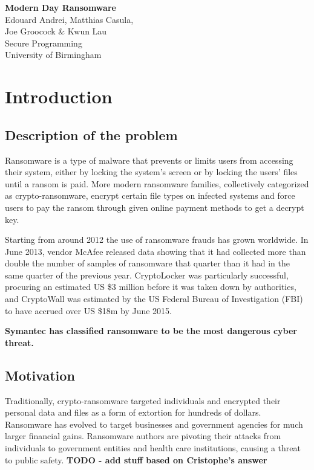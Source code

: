 \documentclass[10pt,a4paper]{article}
\begin{document}
\begin{titlepage}
  \vspace*{\fill}
  \begin{center}
    {\Huge \textbf{Modern Day Ransomware}}\\[0.5cm]
    {\Large Edouard Andrei, Matthias Casula,}\\
    {\Large Joe Groocock \& Kwun Lau}\\[0.6cm]
    {\large Secure Programming}\\
    {\large University of Birmingham}\\[0.4cm]
    {\large {}}
  \end{center}
  \vspace*{\fill}
\end{titlepage}

\tableofcontents

\newpage

\section{Introduction}
\subsection{Description of the problem}
Ransomware is a type of malware that prevents or limits users from accessing their system, either by locking the system's screen or by locking the users' files until a ransom is paid. More modern ransomware families, collectively categorized as crypto-ransomware, encrypt certain file types on infected systems and force users to pay the ransom through given online payment methods to get a decrypt key.

Starting from around 2012 the use of ransomware frauds has grown worldwide. In June 2013, vendor McAfee released data showing that it had collected more than double the number of samples of ransomware that quarter than it had in the same quarter of the previous year. CryptoLocker was particularly successful, procuring an estimated US \$3 million before it was taken down by authorities, and CryptoWall was estimated by the US Federal Bureau of Investigation (FBI) to have accrued over US \$18m by June 2015.

\textbf{Symantec has classified ransomware to be the most dangerous cyber threat. \cite{symantec}}

\subsection{Motivation}
Traditionally, crypto-ransomware targeted individuals and encrypted their personal data and files as a form of extortion for hundreds of dollars. Ransomware has evolved to target businesses and government agencies for much larger financial gains. Ransomware authors are pivoting their attacks from individuals to government entities and health care institutions, causing a threat to public safety. \textbf{TODO - add stuff based on Cristophe's answer}
\end{document}
